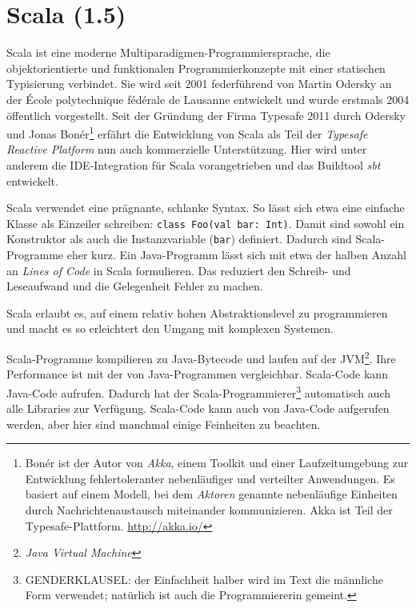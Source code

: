\documentclass[a4paper, 12pt, hidelinks, listof=totoc, listoftables=totoc, bibliography=totoc]{scrreprt}
\begin{document}
\section{Scala (1.5)}



Scala ist eine moderne Multiparadigmen-Programmiersprache, die objektorientierte und funktionalen Programmierkonzepte mit einer statischen Typisierung verbindet. Sie wird seit 2001 federführend von Martin Odersky an der École polytechnique fédérale de Lausanne entwickelt und wurde erstmals 2004 öffentlich vorgestellt.
Seit der Gründung der Firma Typesafe 2011 durch Odersky und Jonas Bonér\footnote{
	Bonér ist der Autor von \textit{Akka}, einem Toolkit und einer Laufzeitumgebung zur Entwicklung fehlertoleranter nebenläufiger und verteilter Anwendungen. Es basiert auf einem Modell, bei dem \textit{Aktoren} genannte nebenläufige Einheiten durch Nachrichtenaustausch miteinander kommunizieren. Akka ist Teil der Typesafe-Plattform. \url{http://akka.io/}}
erfährt die Entwicklung von Scala als Teil der \textit{Typesafe Reactive Platform} nun auch kommerzielle Unterstützung.
Hier wird unter anderem die IDE-Integration für Scala vorangetrieben und das Buildtool \textit{sbt} entwickelt.\cite{scala-lang2011.CSS} 

Scala verwendet eine prägnante, schlanke Syntax. So lässt sich etwa eine einfache Klasse als Einzeiler schreiben: \texttt{class Foo(val bar: Int)}. Damit sind sowohl ein Konstruktor als auch die Instanzvariable (\texttt{bar}) definiert. Dadurch sind Scala-Programme eher kurz. Ein Java-Programm lässt sich mit etwa der halben Anzahl an \textit{Lines of Code} in Scala formulieren. Das reduziert den Schreib- und Leseaufwand und die Gelegenheit Fehler zu machen.

Scala erlaubt es, auf einem relativ hohen Abstraktionslevel zu programmieren und macht es so erleichtert den Umgang mit komplexen Systemen.

Scala-Programme kompilieren zu Java-Bytecode und laufen auf der JVM\footnote{
	\textit{Java Virtual Machine}}. 
Ihre Performance ist mit der von Java-Programmen vergleichbar. Scala-Code kann Java-Code aufrufen. Dadurch hat der Scala-Programmierer\footnote{
	GENDERKLAUSEL: der Einfachheit halber wird im Text die männliche Form verwendet; natürlich ist auch die Programmiererin gemeint.} 
automatisch auch alle Libraries zur Verfügung. Scala-Code kann auch von Java-Code aufgerufen werden, aber hier sind manchmal einige Feinheiten zu beachten.\cite[S. 13 ff.]{odersky2008.PIS}
\end{document}
